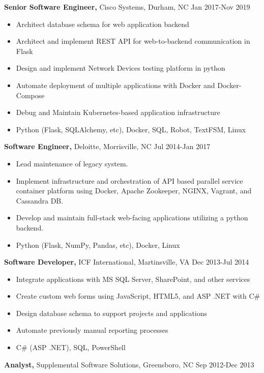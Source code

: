 \documentclass{res}
\begin{document}
\begin{resume}
  {\bf Senior Software Engineer,} Cisco Systems, Durham, NC \hfill Jan 2017-Nov 2019
    \begin{itemize} \itemsep -2pt
      \item Architect database schema for web application backend
      \item Architect and implement REST API for web-to-backend communication in Flask
      \item Design and implement Network Devices testing platform in python
      \item Automate deployment of multiple applications with Docker and Docker-Compose
      \item Debug and Maintain Kubernetes-based application infrastructure
      \item Python (Flask, SQLAlchemy, etc), Docker, SQL, Robot, TextFSM, Linux
    \end{itemize}

  {\bf Software Engineer,} Deloitte, Morrisville, NC \hfill Jul 2014-Jan 2017
    \begin{itemize} \itemsep -2pt
     \item Lead maintenance of legacy system.
     \item Implement infrastructure and orchestration of API based parallel service container platform using Docker, Apache Zookeeper, NGINX, Vagrant, and Cassandra DB.
     \item Develop and maintain full-stack web-facing applications utilizing a python backend.
     \item Python (Flask, NumPy, Pandas, etc), Docker, Linux
     \end{itemize}
  
  {\bf Software Developer,} ICF International, Martinsville, VA \hfill Dec 2013-Jul 2014
    \begin{itemize} \itemsep -2pt  %
      \item Integrate applications with MS SQL Server, SharePoint, and other services
      \item Create custom web forms using JavaScript, HTML5, and ASP .NET with C\#
      \item Design database schema to support projects and applications
      \item Automate previously manual reporting processes
      \item C\# (ASP .NET), SQL, PowerShell
    \end{itemize}

 
  {\bf Analyst,} Supplemental Software Solutions, Greensboro, NC \hfill  Sep 2012-Dec 2013
    

\end{resume}
\end{document}
